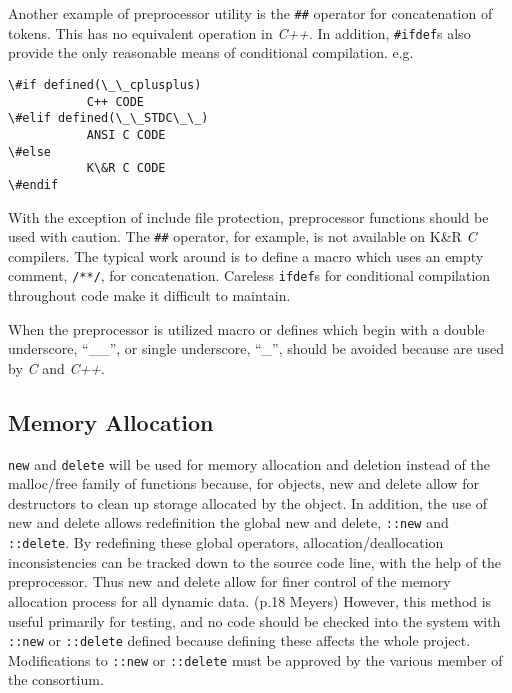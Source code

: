 Another example of preprocessor utility is the \texttt{\#\#} operator for 
concatenation of tokens. This has no equivalent operation in \emph{C++}.
In addition, \texttt{\#ifdef}s also provide the only reasonable means of 
conditional compilation. e.g.
\begin{verbatim}
\#if defined(\_\_cplusplus)
           C++ CODE
\#elif defined(\_\_STDC\_\_)
           ANSI C CODE
\#else
           K\&R C CODE
\#endif
\end{verbatim}

With the exception of include file protection, preprocessor functions 
should be used with caution. The \texttt{\#\#} operator, for example, is not 
available on K\&R \emph{C} compilers. The typical work around is
to define a macro which uses an empty comment, \texttt{/**/}, for
concatenation. Careless \texttt{ifdef}s for conditional
compilation throughout code make it difficult to maintain.

When the preprocessor is utilized macro or defines which begin with a 
double underscore, ``\_\_'', or single underscore, ``\_'', should be 
avoided because are used by \emph{C} and \emph{C++}.

\subsection{Memory Allocation}
\texttt{new} and \texttt{delete} will be used for memory allocation and deletion 
instead of the malloc/free family of functions because, for objects, new and 
delete allow for destructors to clean up storage allocated by the object. 
In addition, the use of new and delete allows redefinition the global 
new and delete, \texttt{::new} and \texttt{::delete}. By redefining these 
global operators, allocation/deallocation inconsistencies can be tracked 
down to the source code line, with the help of the preprocessor. Thus new 
and delete allow for finer control of the memory allocation process for 
all dynamic data. (p.18 Meyers) However, this method is useful primarily for
testing, and no code should be checked into the system with \texttt{::new} or
\texttt{::delete} defined because defining these affects the whole project. 
Modifications to \texttt{::new} or \texttt{::delete} must be approved by the
various member of the consortium.


